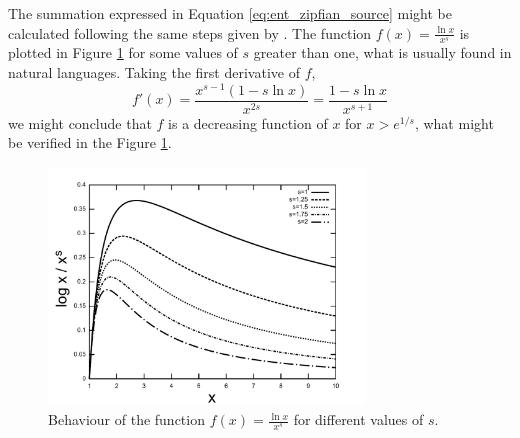 The summation expressed in Equation \ref{eq:ent_zipfian_source} might be calculated following
the same steps given by \cite{grignetti}. The function $f(x)=\frac{\ln x}{x^s}$ is plotted
in Figure \ref{fig:logk_ks} for some values of $s$ greater than one, what is usually found
in natural languages. Taking the first derivative of $f$,
\begin{equation}
f'(x) = \frac{x^{s-1} (1 - s \ln x)}{x^{2s}} = \frac{1-s\ln x}{x^{s+1}}
\end{equation}
we might conclude that $f$ is a decreasing function of $x$ for $x > e^{1/s}$, what
might be verified in the Figure \ref{fig:logk_ks}.


\begin{figure}[htbp]
\centering
\includegraphics[width=0.75\textwidth]{images/logk_ks.pdf}
\caption{Behaviour of the function $f(x)=\frac{\ln x}{x^s}$ for different values of $s$.}
\label{fig:logk_ks}
\end{figure}

